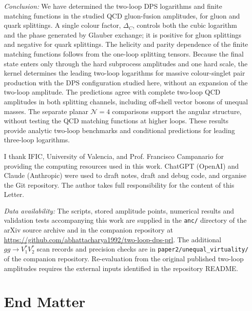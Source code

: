 \documentclass[%
 twocolumn,
 superscriptaddress,
 preprintnumbers,
 nofootinbib,
 amsmath,amssymb,
 aps,
 prl,
]{revtex4-2}
\newcommand{\DD}{\Delta_C}
\begin{document}
\textit{Conclusion:}
We have determined the two-loop DPS logarithms and
finite matching functions in the studied QCD
gluon-fusion amplitudes, for gluon and quark splittings.
A single colour factor, $\DD$, controls both the cubic
logarithm and the phase generated by Glauber exchange;
it is positive for gluon splittings and negative for
quark splittings. The helicity and parity dependence
of the finite matching functions follows from the
one-loop splitting tensors.
Because the final state enters only through the hard
subprocess amplitudes and one hard scale, the kernel
determines the leading two-loop logarithms for massive
colour-singlet pair production with the DPS configuration
studied here, without an expansion of the two-loop amplitude.
The predictions agree with complete two-loop QCD
amplitudes in both splitting channels, including
off-shell vector bosons of unequal masses.
The separate planar $\mathcal N=4$ comparisons
support the angular structure, without testing the
QCD matching functions at higher loops.
These results provide analytic two-loop benchmarks
and conditional predictions for leading three-loop
logarithms.

\begin{acknowledgments}
I thank IFIC, University of Valencia, and Prof. Francisco Campanario for providing the computing resources used in this work.
ChatGPT (OpenAI) and Claude (Anthropic) were used to
draft notes, draft and debug code, and organise the Git
repository.
The author takes full responsibility for the content of this Letter.
\end{acknowledgments}

\textit{Data availability:} The scripts, stored amplitude points, numerical
results and validation tests accompanying this work are supplied in the
\texttt{anc/} directory of the arXiv source archive and in the companion
repository at \url{https://github.com/abhattacharya1992/two-loop-dps-prl}.
The additional $gg\to V_1^*V_2^*$ scan records and precision checks are in \texttt{paper2/unequal\_virtuality/} of the companion repository.
Re-evaluation from the original published two-loop amplitudes requires
the external inputs identified in the repository README.




\section*{End Matter}\label{sec:endmatter}
\end{document}
